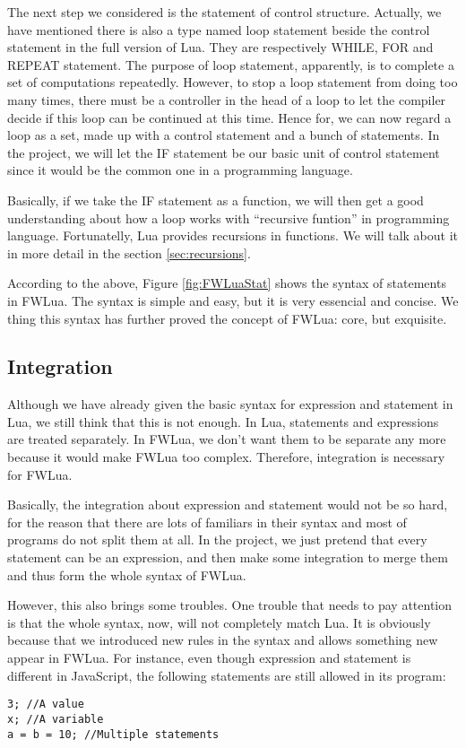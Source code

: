 \documentclass{article}
\begin{document}
The next step we considered is the statement of control structure. Actually, we have mentioned there is also a type named loop statement beside the control statement in the full version of Lua. They are respectively WHILE, FOR and REPEAT statement. The purpose of loop statement, apparently, is to complete a set of computations repeatedly. However, to stop a loop statement from doing too many times, there must be a controller in the head of a loop to let the compiler decide if this loop can be continued at this time. Hence for, we can now regard a loop as a set, made up with a control statement and a bunch of statements. In the project, we will let the IF statement be our basic unit of control statement since it would be the common one in a programming language.

Basically, if we take the IF statement as a function, we will then get a good understanding about how a loop works with ``recursive funtion'' in programming language. Fortunatelly, Lua provides recursions in functions. We will talk about it in more detail in the section \ref{sec:recursions}.

According to the above, Figure \ref{fig:FWLuaStat} shows the syntax of statements in FWLua. The syntax is simple and easy, but it is very essencial and concise. We thing this syntax has further proved the concept of FWLua: core, but exquisite.

\subsection{Integration}
Although we have already given the basic syntax for expression and statement in Lua, we still think that this is not enough. In Lua, statements and expressions are treated separately. In FWLua, we don't want them to be separate any more because it would make FWLua too complex. Therefore, integration is necessary for FWLua.

Basically, the integration about expression and statement would not be so hard, for the reason that there are lots of familiars in their syntax and most of programs do not split them at all. In the project, we just pretend that every statement can be an expression, and then make some integration to merge them and thus form the whole syntax of FWLua. 

However, this also brings some troubles. One trouble that needs to pay attention is that the whole syntax, now, will not completely match Lua. It is obviously because that we introduced new rules in the syntax and allows something new appear in FWLua. For instance, even though expression and statement is different in JavaScript, the following statements are still allowed in its program:
\begin{flushleft}
\tt 3;   //A value\\
\tt x;   //A variable\\
\tt a = b = 10;   //Multiple statements\\
\end{flushleft}
\end{document}

